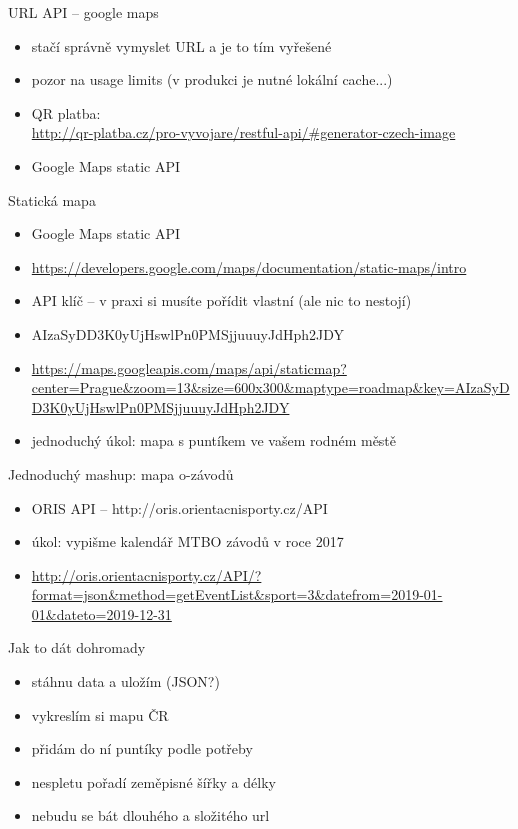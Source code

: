 \documentclass{beamer}
\begin{document}
\begin{frame}{URL API -- google maps}
  \begin{itemize}
    \item stačí správně vymyslet URL a je to tím vyřešené
    \item pozor na usage limits (v produkci je nutné lokální cache...)
    \item QR platba: \\
    {\tiny \url{http://qr-platba.cz/pro-vyvojare/restful-api/\#generator-czech-image}}
    \item Google Maps static API
  \end{itemize}
\end{frame}


\begin{frame}{Statická mapa}
  \begin{itemize}
    \item Google Maps static API
    \item {\tiny \url{https://developers.google.com/maps/documentation/static-maps/intro}}
    \item API klíč -- v praxi si musíte pořídit vlastní (ale nic to nestojí)
    \item AIzaSyDD3K0yUjHswlPn0PMSjjuuuyJdHph2JDY
    \item  {\tiny \url{https://maps.googleapis.com/maps/api/staticmap?center=Prague\&zoom=13\&size=600x300\&maptype=roadmap\&key=AIzaSyDD3K0yUjHswlPn0PMSjjuuuyJdHph2JDY}}
    \item jednoduchý úkol: mapa s puntíkem ve vašem rodném městě
  \end{itemize}
\end{frame}

\begin{frame}{Jednoduchý mashup: mapa o-závodů}
  \begin{itemize}
    \item ORIS API -- http://oris.orientacnisporty.cz/API
    \item úkol: vypišme kalendář MTBO závodů v roce 2017
    \item {\tiny \url{http://oris.orientacnisporty.cz/API/?format=json\&method=getEventList\&sport=3\&datefrom=2019-01-01\&dateto=2019-12-31}}
  \end{itemize}
\end{frame}


\begin{frame}{Jak to dát dohromady}
  \begin{itemize}
    \item stáhnu data a uložím (JSON?)
    \item vykreslím si mapu ČR
    \item přidám do ní puntíky podle potřeby
    \item nespletu pořadí zeměpisné šířky a délky
    \item nebudu se bát dlouhého a složitého url
  \end{itemize}
\end{frame}
\end{document}
